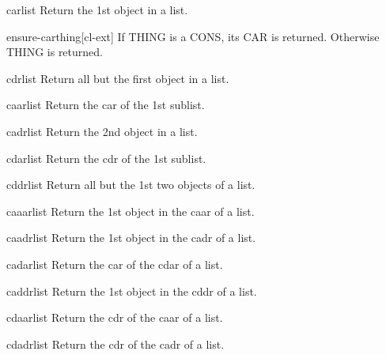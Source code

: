 \documentclass[10pt,english]{book}
\begin{document}
\begin{accessor}{car}{list}
  Return the 1st object in a list.
\end{accessor}

\begin{function}{ensure-car}{thing}[cl-ext]
  If THING is a CONS, its CAR is returned. Otherwise THING is returned.
\end{function}

\begin{accessor}{cdr}{list}
  Return all but the first object in a list.
\end{accessor}

\begin{accessor}{caar}{list}
  Return the car of the 1st sublist.
\end{accessor}

\begin{accessor}{cadr}{list}
  Return the 2nd object in a list.
\end{accessor}

\begin{accessor}{cdar}{list}
  Return the cdr of the 1st sublist.
\end{accessor}

\begin{accessor}{cddr}{list}
  Return all but the 1st two objects of a list.
\end{accessor}

\begin{accessor}{caaar}{list}
  Return the 1st object in the caar of a list.
\end{accessor}

\begin{accessor}{caadr}{list}
  Return the 1st object in the cadr of a list.
\end{accessor}

\begin{accessor}{cadar}{list}
  Return the car of the cdar of a list.
\end{accessor}

\begin{accessor}{caddr}{list}
  Return the 1st object in the cddr of a list.
\end{accessor}

\begin{accessor}{cdaar}{list}
  Return the cdr of the caar of a list.
\end{accessor}

\begin{accessor}{cdadr}{list}
  Return the cdr of the cadr of a list.
\end{accessor}
\end{document}

